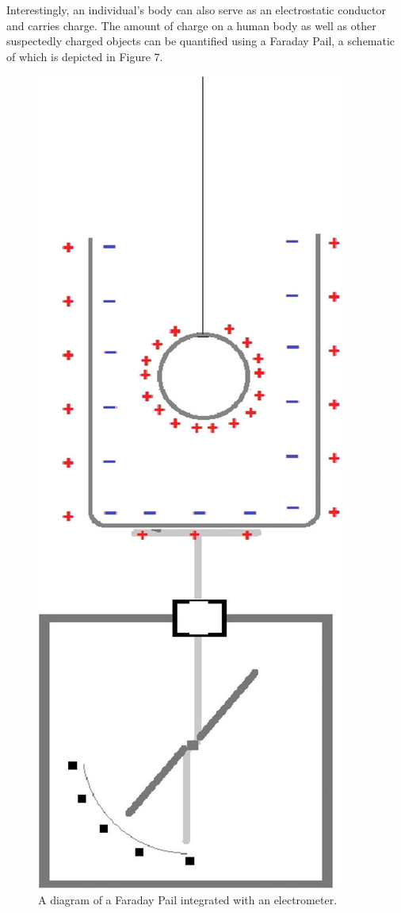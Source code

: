\documentclass[12pt]{amsart}
\begin{document}
\indent Interestingly, an individual’s body can also serve as an electrostatic conductor and carries charge. The amount of charge on a human body as well as other suspectedly charged objects can be quantified using a Faraday Pail, a schematic of which is depicted in Figure 7. \\
\begin{figure}[h]
	\includegraphics[width=\tinygraph,scale=0.01]{Farday.png}
	\caption{A diagram of a Faraday Pail integrated with an electrometer.}
	\label{Farday}
\end{figure} 
\end{document}
